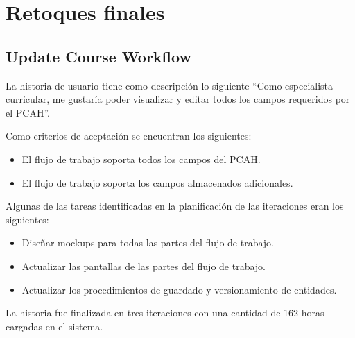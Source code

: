\section{Retoques finales}
\subsection{Update Course Workflow}
La historia de usuario tiene como descripción lo siguiente \enquote{Como especialista curricular, me gustaría poder visualizar y editar todos los campos requeridos por el PCAH}.

Como criterios de aceptación se encuentran los siguientes:
\begin{itemize}
	\item El flujo de trabajo soporta todos los campos del PCAH.
	\item El flujo de trabajo soporta los campos almacenados adicionales.
\end{itemize}

Algunas de las tareas identificadas en la planificación de las iteraciones eran los siguientes:
\begin{itemize}
	\item Diseñar mockups para todas las partes del flujo de trabajo.
	\item Actualizar las pantallas de las partes del flujo de trabajo.
	\item Actualizar los procedimientos de guardado y versionamiento de entidades.
\end{itemize}

La historia fue finalizada en tres iteraciones con una cantidad de 162 horas cargadas en el sistema.